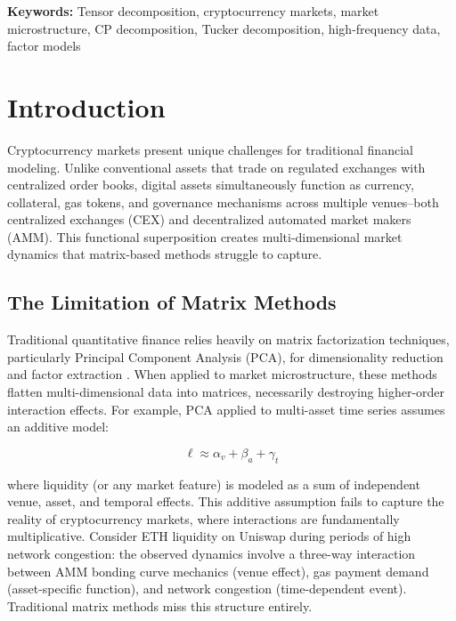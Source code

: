 \documentclass{article}
\begin{document}
\vspace{0.5em}
\noindent \textbf{Keywords:} Tensor decomposition, cryptocurrency markets, market microstructure, CP decomposition, Tucker decomposition, high-frequency data, factor models

\tableofcontents

\clearpage
\twocolumn
{}  %


\section{Introduction}
\label{sec:introduction}

Cryptocurrency markets present unique challenges for traditional financial modeling. Unlike conventional assets that trade on regulated exchanges with centralized order books, digital assets simultaneously function as currency, collateral, gas tokens, and governance mechanisms across multiple venues--both centralized exchanges (CEX) and decentralized automated market makers (AMM). This functional superposition creates multi-dimensional market dynamics that matrix-based methods struggle to capture.

\subsection{The Limitation of Matrix Methods}

Traditional quantitative finance relies heavily on matrix factorization techniques, particularly Principal Component Analysis (PCA), for dimensionality reduction and factor extraction \citep{Cont2001Empirical,Fan2013Large}. When applied to market microstructure, these methods flatten multi-dimensional data into matrices, necessarily destroying higher-order interaction effects. For example, PCA applied to multi-asset time series assumes an additive model:

$$\ell \approx \alpha_{v} + \beta_{a} + \gamma_{t}$$

where liquidity (or any market feature) is modeled as a sum of independent venue, asset, and temporal effects. This additive assumption fails to capture the reality of cryptocurrency markets, where interactions are fundamentally multiplicative. Consider ETH liquidity on Uniswap during periods of high network congestion: the observed dynamics involve a three-way interaction between AMM bonding curve mechanics (venue effect), gas payment demand (asset-specific function), and network congestion (time-dependent event). Traditional matrix methods miss this structure entirely.
\end{document}
